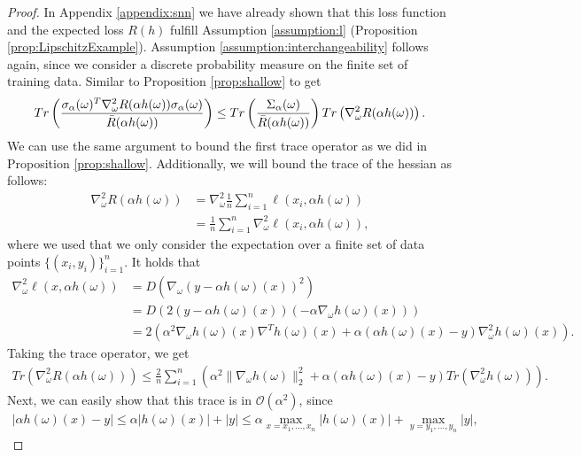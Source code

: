 \documentclass[10pt]{article} %
\newcommand{\cO}{\mathcal{O}}
\begin{document}
    \begin{proof}
        In Appendix \ref{appendix:snn} we have already shown that this loss function and the expected loss $R(h)$ fulfill Assumption \ref{assumption:l} (Proposition \ref{prop:LipschitzExample}). Assumption \ref{assumption:interchangeability} follows again, since we consider a discrete probability measure on the finite set of training data. Similar to Proposition \ref{prop:shallow} to get
        \begin{align*}
            Tr\left(\frac{\sigma_\alpha(\omega)^T\nabla_\omega^2R(\alpha h(\omega))\sigma_\alpha(\omega)}{\Bar{R}(\alpha h(\omega))}\right)\leq Tr\left(\frac{\Sigma_\alpha(\omega)}{\Bar{R}(\alpha h(\omega))}\right) Tr\left(\nabla_\omega^2R(\alpha h(\omega))\right).
        \end{align*}
        We can use the same argument to bound the first trace operator as we did in Proposition \ref{prop:shallow}. Additionally, we will bound the trace of the hessian as follows:
        \begin{align*}
            \nabla_\omega^2 R(\alpha h(\omega))&=\nabla_\omega^2\frac{1}{n}\sum_{i=1}^n \ell(x_i,\alpha h(\omega))\\
            &=\frac{1}{n}\sum_{i=1}^n\nabla^2_\omega \ell(x_i,\alpha h(\omega)),
        \end{align*}
        where we used that we only consider the expectation over a finite set of data points $\{(x_i,y_i)\}_{i=1}^n$. It holds that 
        \begin{align*}
            \nabla^2_\omega \ell(x,\alpha h(\omega))&=D(\nabla_\omega(y-\alpha h(\omega)(x))^2)\\
            &=D(2(y-\alpha h(\omega)(x))(-\alpha\nabla_\omega h(\omega)(x)))\\
            &=2(\alpha^2\nabla_\omega h(\omega)(x)\nabla^Th(\omega)(x)+\alpha(\alpha h(\omega)(x)-y)\nabla^2_\omega h(\omega)(x)).
        \end{align*}
        Taking the trace operator, we get
        \begin{align*}
            Tr(\nabla^2_\omega R(\alpha h(\omega)))\leq \frac{2}{n}\sum_{i=1}^n(\alpha^2\|\nabla_\omega h(\omega)\|_2^2+\alpha (\alpha h(\omega)(x)-y)Tr(\nabla_\omega^2h(\omega))).
        \end{align*}
        Next, we can easily show that this trace is in $\cO(\alpha^2)$, since 
        \begin{align*}
            |\alpha h(\omega)(x)-y|\leq \alpha |h(\omega)(x)|+|y|\leq \alpha \max_{x=x_1,...,x_n}|h(\omega)(x)|+\max_{y= y_1,...,y_n}|y|,

\end{align*}
\end{proof}
\end{document}
